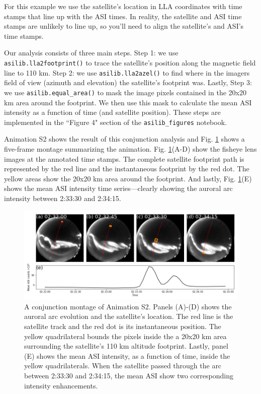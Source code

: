 \documentclass[utf8]{FrontiersinHarvard} %
\begin{document}
For this example we use the satellite's location in LLA coordinates with time stamps that line up with the ASI times. In reality, the satellite and ASI time stamps are unlikely to line up, so you'll need to align the satellite's and ASI's time stamps.

Our analysis consists of three main steps. Step 1: we use \verb|asilib.lla2footprint()| to trace the satellite's position along the magnetic field line to 110 km. Step 2: we use \verb|asilib.lla2azel()| to find where in the imagers field of view (azimuth and elevation) the satellite's footprint was. Lastly, Step 3: we use \verb|asilib.equal_area()| to mask the image pixels contained in the 20x20 km area around the footprint. We then use this mask to calculate the mean ASI intensity as a function of time (and satellite position). These steps are implemented in the ``Figure 4" section of the \verb|asilib_figures| notebook.

Animation S2 shows the result of this conjunction analysis and Fig. \ref{fig4} shows a five-frame montage summarizing the animation. Fig. \ref{fig4}(A-D) show the fisheye lens images at the annotated time stamps. The complete satellite footprint path is represented by the red line and the instantaneous footprint by the red dot. The yellow areas show the 20x20 km area around the footprint. And lastly, Fig. \ref{fig4}(E) shows the mean ASI intensity time series---clearly showing the auroral arc intensity between 2:33:30 and 2:34:15.

\begin{figure}
      \includegraphics[width=\textwidth]{figures/fig4.png}
      \caption{A conjunction montage of Animation S2. Panels (A)-(D) shows the auroral arc evolution and the satellite's location. The red line is the satellite track and the red dot is its instantaneous position. The yellow quadrilateral bounds the pixels inside the a 20x20 km area surrounding the satellite's 110 km altitude footprint. Lastly, panel (E) shows the mean ASI intensity, as a function of time, inside the yellow quadrilaterals. When the satellite passed through the arc between 2:33:30 and 2:34:15, the mean ASI show two corresponding intensity enhancements.}
      \label{fig4}
\end{figure}
\end{document}
